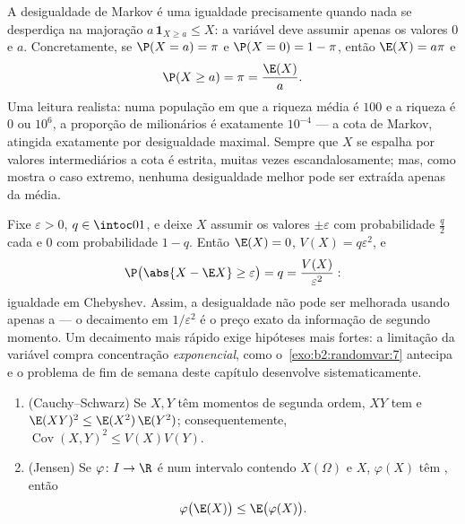 \begin{example}\label{ex:b2:randomvar:markovsharp}
A desigualdade de Markov é uma igualdade precisamente quando nada se
desperdiça na majoração $a\,\mathbf 1_{X\geq a} \leq X$: a
variável deve assumir apenas os valores $0$ e $a$. Concretamente,
se $\P(X = a) = \pi$ e $\P(X = 0) = 1 - \pi$, então $\E(X)
= a\pi$ e
\[
\P(X \geq a) = \pi = \frac{\E(X)}{a} .
\]
Uma leitura realista: numa população em que a riqueza média é
$100$ e a riqueza é $0$ ou $10^6$, a proporção de
milionários é exatamente $10^{-4}$ --- a cota de Markov, atingida
exatamente por desigualdade maximal. Sempre que $X$ se espalha por
valores intermediários a cota é estrita, muitas vezes escandalosamente;
mas, como mostra o caso extremo, nenhuma desigualdade melhor pode ser
extraída apenas da média.
\end{example}

\begin{example}\label{ex:b2:randomvar:chebsharp}
Fixe $\varepsilon > 0$, $q \in \intoc01$, e deixe $X$ assumir os
valores $\pm\varepsilon$ com probabilidade $\frac q2$ cada e
$0$ com probabilidade $1 - q$. Então $\E(X) = 0$, $V(X) =
q\varepsilon^2$, e
\[
\P\bigl(\abs{X - \E X} \geq \varepsilon\bigr) = q
= \frac{V(X)}{\varepsilon^2} :
\]
igualdade em Chebyshev. Assim, a desigualdade não pode ser melhorada
usando apenas a  --- o decaimento em $1/\varepsilon^2$ é
o preço exato da informação de segundo momento. Um decaimento mais rápido
exige hipóteses mais fortes: a limitação da variável
compra concentração \emph{exponencial}, como
o~\cref{exo:b2:randomvar:7} antecipa e o problema de fim de semana
deste capítulo desenvolve sistematicamente.
\end{example}

\begin{theorem}\label{thm:b2:randomvar:jensen}
\leavevmode
\begin{enumerate}
\item (Cauchy--Schwarz) Se $X, Y$ têm momentos de segunda ordem, $XY$ tem
 e $\E(XY)^2 \leq \E(X^2)\,\E(Y^2)$; consequentemente,
$\operatorname{Cov}(X,Y)^2 \leq V(X)V(Y)$.
\item (Jensen) Se $\varphi \colon I \to \R$ é  num
intervalo contendo $X(\Omega)$ e $X$, $\varphi(X)$ têm
, então
\[
\varphi\bigl(\E(X)\bigr) \leq \E\bigl(\varphi(X)\bigr) .
\]
\end{enumerate}
\end{theorem}


